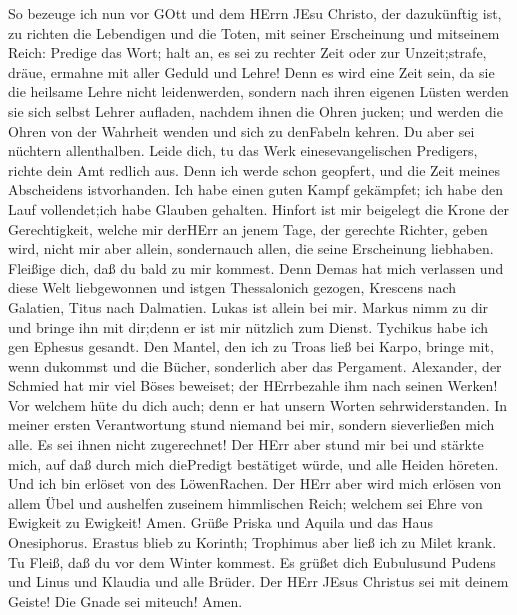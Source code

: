  So bezeuge ich nun vor GOtt und dem HErrn JEsu Christo, der
dazukünftig ist, zu richten die Lebendigen und die Toten, mit seiner
Erscheinung und mitseinem Reich:  Predige das Wort; halt an,
es sei zu rechter Zeit oder zur Unzeit;strafe, dräue, ermahne mit aller
Geduld und Lehre!  Denn es wird eine Zeit sein, da sie die
heilsame Lehre nicht leidenwerden, sondern nach ihren eigenen Lüsten
werden sie sich selbst Lehrer aufladen, nachdem ihnen die Ohren jucken;
 und werden die Ohren von der Wahrheit wenden und sich zu
denFabeln kehren.  Du aber sei nüchtern allenthalben. Leide
dich, tu das Werk einesevangelischen Predigers, richte dein Amt redlich
aus.  Denn ich werde schon geopfert, und die Zeit meines
Abscheidens istvorhanden.  Ich habe einen guten Kampf
gekämpfet; ich habe den Lauf vollendet;ich habe Glauben gehalten.
 Hinfort ist mir beigelegt die Krone der Gerechtigkeit,
welche mir derHErr an jenem Tage, der gerechte Richter, geben wird,
nicht mir aber allein, sondernauch allen, die seine Erscheinung
liebhaben.  Fleißige dich, daß du bald zu mir kommest.
 Denn Demas hat mich verlassen und diese Welt liebgewonnen
und istgen Thessalonich gezogen, Krescens nach Galatien, Titus nach
Dalmatien.  Lukas ist allein bei mir. Markus nimm zu dir
und bringe ihn mit dir;denn er ist mir nützlich zum Dienst.
 Tychikus habe ich gen Ephesus gesandt.  Den
Mantel, den ich zu Troas ließ bei Karpo, bringe mit, wenn dukommst und
die Bücher, sonderlich aber das Pergament.  Alexander, der
Schmied hat mir viel Böses beweiset; der HErrbezahle ihm nach seinen
Werken!  Vor welchem hüte du dich auch; denn er hat unsern
Worten sehrwiderstanden.  In meiner ersten Verantwortung
stund niemand bei mir, sondern sieverließen mich alle. Es sei ihnen
nicht zugerechnet!  Der HErr aber stund mir bei und stärkte
mich, auf daß durch mich diePredigt bestätiget würde, und alle Heiden
höreten. Und ich bin erlöset von des LöwenRachen.  Der HErr
aber wird mich erlösen von allem Übel und aushelfen zuseinem himmlischen
Reich; welchem sei Ehre von Ewigkeit zu Ewigkeit! Amen. 
Grüße Priska und Aquila und das Haus Onesiphorus.  Erastus
blieb zu Korinth; Trophimus aber ließ ich zu Milet krank. 
Tu Fleiß, daß du vor dem Winter kommest. Es grüßet dich Eubulusund
Pudens und Linus und Klaudia und alle Brüder.  Der HErr
JEsus Christus sei mit deinem Geiste! Die Gnade sei miteuch! Amen.
